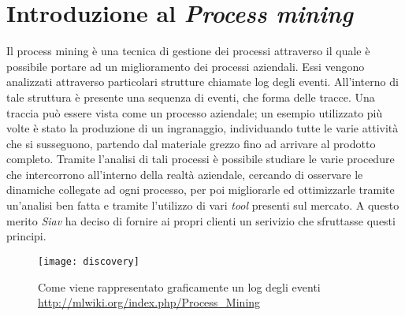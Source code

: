 \section{Introduzione al \textit{Process mining}}
Il process mining è una tecnica di gestione dei processi attraverso il quale è possibile portare ad un miglioramento dei processi aziendali. Essi vengono analizzati attraverso particolari strutture chiamate log degli eventi. All'interno di tale struttura è presente una sequenza di eventi, che forma delle tracce. Una traccia può essere vista come un processo aziendale; un esempio utilizzato più volte è stato la produzione di un ingranaggio, individuando tutte le varie attività che si susseguono, partendo dal materiale grezzo fino ad arrivare al prodotto completo. Tramite l'analisi di tali processi è possibile studiare le varie procedure che intercorrono all'interno della realtà aziendale, cercando di osservare le dinamiche collegate ad ogni processo, per poi migliorarle ed ottimizzarle tramite un'analisi ben fatta e tramite l'utilizzo di vari \textit{tool} presenti sul mercato. A questo merito \textit{Siav} ha deciso di fornire ai propri clienti un serivizio che sfruttasse questi principi.
\begin{figure}[!h] 
	\centering 
	\texttt{[image: discovery]} 
	\caption{Come viene rappresentato graficamente un log degli eventi \url{http://mlwiki.org/index.php/Process_Mining}}
\end{figure}
\newpage
